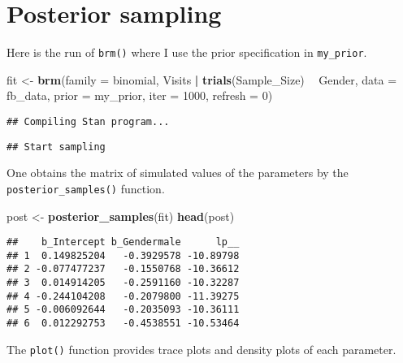 \documentclass[
]{book}
\newenvironment{Shaded}{\begin{snugshade}}{\end{snugshade}}
\newcommand{\DataTypeTok}[1]{\textcolor[rgb]{0.13,0.29,0.53}{#1}}
\newcommand{\DecValTok}[1]{\textcolor[rgb]{0.00,0.00,0.81}{#1}}
\newcommand{\KeywordTok}[1]{\textcolor[rgb]{0.13,0.29,0.53}{\textbf{#1}}}
\newcommand{\NormalTok}[1]{#1}
\newcommand{\OperatorTok}[1]{\textcolor[rgb]{0.81,0.36,0.00}{\textbf{#1}}}
\newcommand{\StringTok}[1]{\textcolor[rgb]{0.31,0.60,0.02}{#1}}
\begin{document}
\hypertarget{posterior-sampling}{%
\section{Posterior sampling}\label{posterior-sampling}}

Here is the run of \texttt{brm()} where I use the prior specification in \texttt{my\_prior}.

\begin{Shaded}
\begin{Highlighting}[]
\NormalTok{fit <-}\StringTok{ }\KeywordTok{brm}\NormalTok{(}\DataTypeTok{family =}\NormalTok{ binomial,}
\NormalTok{           Visits }\OperatorTok{|}\StringTok{ }\KeywordTok{trials}\NormalTok{(Sample_Size) }\OperatorTok{~}\StringTok{ }\NormalTok{Gender,}
           \DataTypeTok{data =}\NormalTok{ fb_data,}
           \DataTypeTok{prior =}\NormalTok{ my_prior,}
           \DataTypeTok{iter =} \DecValTok{1000}\NormalTok{,}
           \DataTypeTok{refresh =} \DecValTok{0}\NormalTok{)}
\end{Highlighting}
\end{Shaded}

\begin{verbatim}
## Compiling Stan program...
\end{verbatim}

\begin{verbatim}
## Start sampling
\end{verbatim}

One obtains the matrix of simulated values of the parameters by the \texttt{posterior\_samples()} function.

\begin{Shaded}
\begin{Highlighting}[]
\NormalTok{post <-}\StringTok{ }\KeywordTok{posterior_samples}\NormalTok{(fit)}
\KeywordTok{head}\NormalTok{(post)}
\end{Highlighting}
\end{Shaded}

\begin{verbatim}
##    b_Intercept b_Gendermale      lp__
## 1  0.149825204   -0.3929578 -10.89798
## 2 -0.077477237   -0.1550768 -10.36612
## 3  0.014914205   -0.2591160 -10.32287
## 4 -0.244104208   -0.2079800 -11.39275
## 5 -0.006092644   -0.2035093 -10.36111
## 6  0.012292753   -0.4538551 -10.53464
\end{verbatim}

The \texttt{plot()} function provides trace plots and density plots of each parameter.
\end{document}
